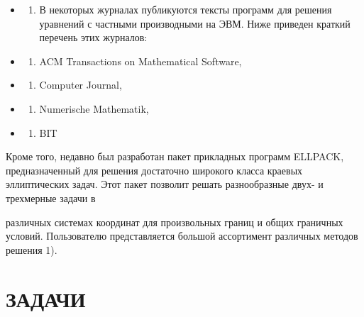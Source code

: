 \documentclass[
  ukrainian,
]{article}
\providecommand{\tightlist}{%
  \setlength{\itemsep}{0pt}\setlength{\parskip}{0pt}}
\begin{document}
\begin{itemize}
\tightlist
\item
  \begin{enumerate}
  \def\labelenumi{\arabic{enumi}.}
  \setcounter{enumi}{6}
  \tightlist
  \item
    В некоторых журналах публикуются тексты программ для решения
    уравнений с частными производными на ЭВМ. Ниже приведен краткий
    перечень этих журналов:
  \end{enumerate}
\item
  \begin{enumerate}
  \def\labelenumi{\alph{enumi})}
  \tightlist
  \item
    ACM Transactions on Mathematical Software,
  \end{enumerate}
\item
  \begin{enumerate}
  \def\labelenumi{\arabic{enumi})}
  \setcounter{enumi}{5}
  \tightlist
  \item
    Computer Journal,
  \end{enumerate}
\item
  \begin{enumerate}
  \def\labelenumi{\Alph{enumi})}
  \setcounter{enumi}{1}
  \tightlist
  \item
    Numerische Mathematik,
  \end{enumerate}
\item
  \begin{enumerate}
  \def\labelenumi{\alph{enumi})}
  \setcounter{enumi}{17}
  \tightlist
  \item
    BIT
  \end{enumerate}
\end{itemize}

Кроме того, недавно был разработан пакет прикладных программ ELLPACK,
предназначенный для решения достаточно широкого класса краевых
эллиптических задач. Этот пакет позволит решать разнообразные двух- и
трехмерные задачи в

различных системах координат для произвольных границ и общих граничных
условий. Пользователю представляется большой ассортимент различных
методов решения 1).

\section{ЗАДАЧИ}\label{ux437ux430ux434ux430ux447ux438-5}
\end{document}
